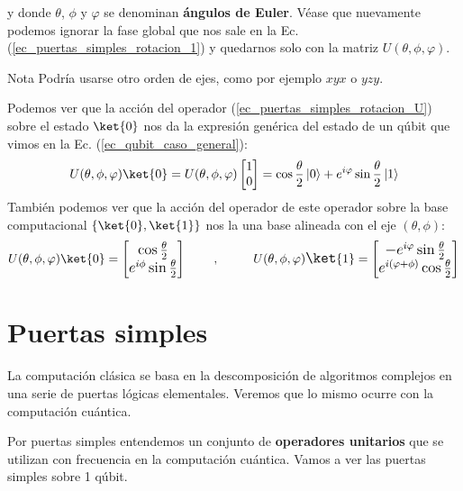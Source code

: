 \documentclass[a4paper,11pt]{book} %
\numberwithin{equation}{chapter}
\def\lch{\left\{}
\def\rch{\right\}}
\begin{document}
y donde $\theta$, $\phi$ y $\varphi$ se denominan \textbf{ángulos de Euler}. Véase que nuevamente podemos ignorar la fase global que nos sale en la Ec. (\ref{ec_puertas_simples_rotacion_1}) y quedarnos solo con la matriz $U (\theta, \phi, \varphi)$.

\begin{mybox_blue}{Nota}
Podría usarse otro orden de ejes, como por ejemplo $xyx$ o $yzy$.
\end{mybox_blue}

Podemos ver que la acción del operador (\ref{ec_puertas_simples_rotacion_U}) sobre el estado $\ket{0}$ nos da la expresión genérica del estado de un qúbit que vimos en la Ec. (\ref{ec_qubit_caso_general}):
	\begin{equation}
	U (\theta, \phi, \varphi) \ket{0} = 
	U (\theta, \phi, \varphi) \begin{bmatrix} 1 \\ 0 \end{bmatrix} = 
	 \cos{\frac{\theta}{2}}\, |0\rangle + e^{i\varphi}\sin{\frac{\theta}{2}}\,|1\rangle
	\end{equation}
También podemos ver que la acción del operador de este operador sobre la base computacional $\lch \ket{0}, \ket{1} \rch$ nos la una base alineada con el eje $(\theta, \phi)$:
	\begin{equation}
	U(\theta,\phi,\varphi) \ket{0} = 
		\large{\begin{bmatrix} \cos \frac{\theta}{2}  \\ e^{i\phi} \sin \frac{\theta}{2} \end{bmatrix} }
	~~~~~~,~~~~~~~
	U(\theta,\phi,\varphi) \ket{1} = 
		\large{\begin{bmatrix} -e^{i\varphi}\sin \frac{\theta}{2} \\ e^{i(\varphi + \phi)} \cos \frac{\theta}{2} \end{bmatrix} }
	\end{equation}

    \section{Puertas simples}

La computación clásica se basa en la descomposición de algoritmos complejos en una serie de puertas lógicas elementales. Veremos que lo mismo ocurre con la computación cuántica.  

Por puertas simples entendemos un conjunto de \textbf{operadores unitarios} que se utilizan con frecuencia en la computación cuántica. Vamos a ver las puertas simples sobre 1 qúbit. 
\end{document}
